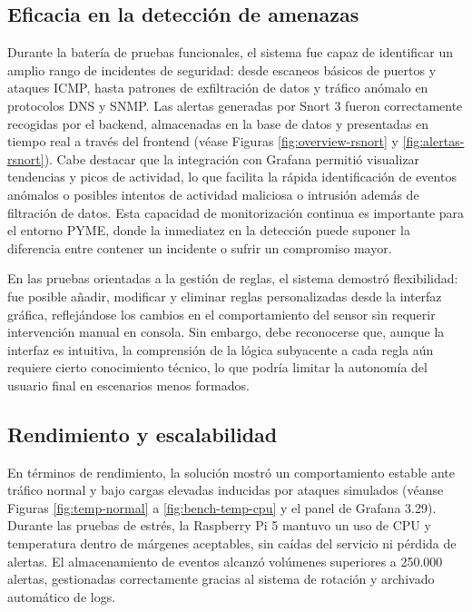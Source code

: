 \documentclass[11pt,a4paper,twoside]{report}
\begin{document}
\subsection{Eficacia en la detección de amenazas}

Durante la batería de pruebas funcionales, el sistema fue capaz de identificar un amplio rango de incidentes de seguridad: desde escaneos básicos de puertos y ataques ICMP, hasta patrones de exfiltración de datos y tráfico anómalo en protocolos DNS y SNMP. Las alertas generadas por Snort 3 fueron correctamente recogidas por el backend, almacenadas en la base de datos y presentadas en tiempo real a través del frontend (véase Figuras \ref{fig:overview-rsnort} y \ref{fig:alertas-rsnort}). Cabe destacar que la integración con Grafana permitió visualizar tendencias y picos de actividad, lo que facilita la rápida identificación de eventos anómalos o posibles intentos de actividad maliciosa o intrusión además de filtración de datos. Esta capacidad de monitorización continua es importante para el entorno PYME, donde la inmediatez en la detección puede suponer la diferencia entre contener un incidente o sufrir un compromiso mayor.\newline

En las pruebas orientadas a la gestión de reglas, el sistema demostró flexibilidad: fue posible añadir, modificar y eliminar reglas personalizadas desde la interfaz gráfica, reflejándose los cambios en el comportamiento del sensor sin requerir intervención manual en consola. Sin embargo, debe reconocerse que, aunque la interfaz es intuitiva, la comprensión de la lógica subyacente a cada regla aún requiere cierto conocimiento técnico, lo que podría limitar la autonomía del usuario final en escenarios menos formados.

\subsection{Rendimiento y escalabilidad}

En términos de rendimiento, la solución mostró un comportamiento estable ante tráfico normal y bajo cargas elevadas inducidas por ataques simulados (véanse Figuras \ref{fig:temp-normal} a \ref{fig:bench-temp-cpu} y el panel de Grafana 3.29). Durante las pruebas de estrés, la Raspberry Pi 5 mantuvo un uso de CPU y temperatura dentro de márgenes aceptables, sin caídas del servicio ni pérdida de alertas. El almacenamiento de eventos alcanzó volúmenes superiores a 250.000 alertas, gestionadas correctamente gracias al sistema de rotación y archivado automático de logs.\newline
\end{document}
